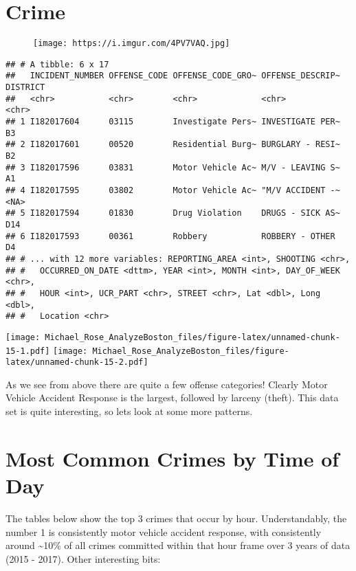 \documentclass[]{article}
\begin{document}
\newpage

\section{Crime}\label{crime}

\begin{figure}
\centering
\texttt{[image: https://i.imgur.com/4PV7VAQ.jpg]}
\caption{}
\end{figure}

\begin{verbatim}
## # A tibble: 6 x 17
##   INCIDENT_NUMBER OFFENSE_CODE OFFENSE_CODE_GRO~ OFFENSE_DESCRIP~ DISTRICT
##   <chr>           <chr>        <chr>             <chr>            <chr>   
## 1 I182017604      03115        Investigate Pers~ INVESTIGATE PER~ B3      
## 2 I182017601      00520        Residential Burg~ BURGLARY - RESI~ B2      
## 3 I182017596      03831        Motor Vehicle Ac~ M/V - LEAVING S~ A1      
## 4 I182017595      03802        Motor Vehicle Ac~ "M/V ACCIDENT -~ <NA>    
## 5 I182017594      01830        Drug Violation    DRUGS - SICK AS~ D14     
## 6 I182017593      00361        Robbery           ROBBERY - OTHER  D4      
## # ... with 12 more variables: REPORTING_AREA <int>, SHOOTING <chr>,
## #   OCCURRED_ON_DATE <dttm>, YEAR <int>, MONTH <int>, DAY_OF_WEEK <chr>,
## #   HOUR <int>, UCR_PART <chr>, STREET <chr>, Lat <dbl>, Long <dbl>,
## #   Location <chr>
\end{verbatim}

\texttt{[image: Michael\_Rose\_AnalyzeBoston\_files/figure-latex/unnamed-chunk-15-1.pdf]}
\texttt{[image: Michael\_Rose\_AnalyzeBoston\_files/figure-latex/unnamed-chunk-15-2.pdf]}

As we see from above there are quite a few offense categories! Clearly
Motor Vehicle Accident Response is the largest, followed by larceny
(theft). This data set is quite interesting, so lets look at some more
patterns.

\newpage

\section{Most Common Crimes by Time of
Day}\label{most-common-crimes-by-time-of-day}

The tables below show the top 3 crimes that occur by hour.
Understandably, the number 1 is consistently motor vehicle accident
response, with consistently around \textasciitilde{}10\% of all crimes
committed within that hour frame over 3 years of data (2015 - 2017).
Other interesting bits:
\end{document}
